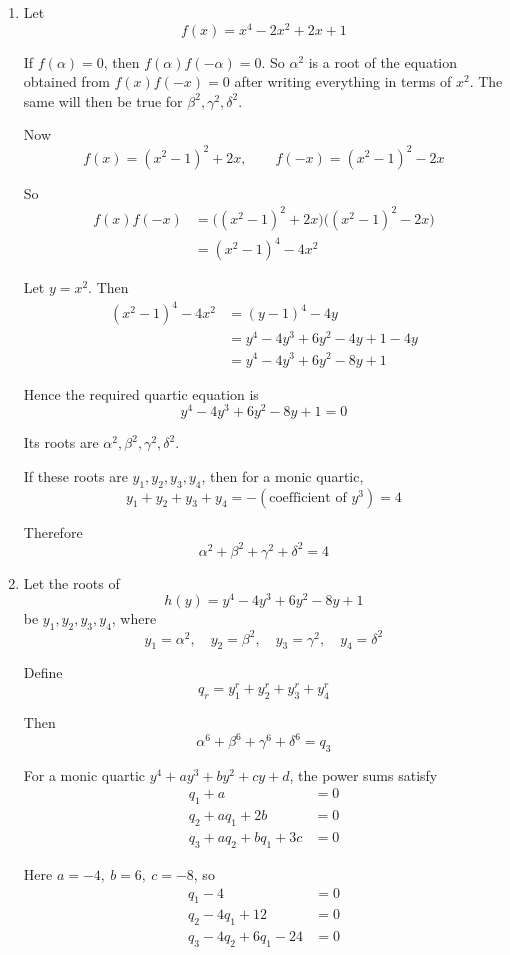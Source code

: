 \documentclass[leqno]{article}
\begin{document}
\begin{enumerate}[
  label=\textbf{\arabic*.},
  leftmargin=*,
  topsep=0pt,
  partopsep=0pt,
  parsep=0pt
]
\begin{tcolorbox}[colback=white, colframe=scarlet, title={\textbf{Solution}}, breakable, grow to left by=6mm, grow to right by=10mm]
\begin{enumerate}[label=\textbf{(\alph*)}]
  \item Let
\[
f(x)=x^4-2x^2+2x+1
\]

If \(f(\alpha)=0\), then \(f(\alpha)f(-\alpha)=0\). So \(\alpha^2\) is a root of the equation obtained from \(f(x)f(-x)=0\) after writing everything in terms of \(x^2\). The same will then be true for \(\beta^2,\gamma^2,\delta^2\).

Now
\[
f(x)=(x^2-1)^2+2x,\qquad f(-x)=(x^2-1)^2-2x
\]

So
\begin{align*}
f(x)f(-x)
&=\bigl((x^2-1)^2+2x\bigr)\bigl((x^2-1)^2-2x\bigr)\\
&=(x^2-1)^4-4x^2
\end{align*}

Let \(y=x^2\). Then
\begin{align*}
(x^2-1)^4-4x^2
&=(y-1)^4-4y\\
&=y^4-4y^3+6y^2-4y+1-4y\\
&=y^4-4y^3+6y^2-8y+1
\end{align*}

Hence the required quartic equation is
\[
y^4-4y^3+6y^2-8y+1=0
\]

Its roots are \(\alpha^2,\beta^2,\gamma^2,\delta^2\).

If these roots are \(y_1,y_2,y_3,y_4\), then for a monic quartic,
\[
y_1+y_2+y_3+y_4=-(\text{coefficient of }y^3)=4
\]

Therefore
\[
\alpha^2+\beta^2+\gamma^2+\delta^2=4
\]

  \item Let the roots of
\[
h(y)=y^4-4y^3+6y^2-8y+1
\]
be \(y_1,y_2,y_3,y_4\), where
\[
y_1=\alpha^2,\quad y_2=\beta^2,\quad y_3=\gamma^2,\quad y_4=\delta^2
\]

Define
\[
q_r=y_1^r+y_2^r+y_3^r+y_4^r
\]

Then
\[
\alpha^6+\beta^6+\gamma^6+\delta^6=q_3
\]

For a monic quartic \(y^4+ay^3+by^2+cy+d\), the power sums satisfy
\begin{align*}
q_1+a&=0\\
q_2+aq_1+2b&=0\\
q_3+aq_2+bq_1+3c&=0
\end{align*}

Here \(a=-4,\ b=6,\ c=-8\), so
\begin{align*}
q_1-4&=0\\
q_2-4q_1+12&=0\\
q_3-4q_2+6q_1-24&=0
\end{align*}


\end{enumerate}
\end{tcolorbox}
\end{enumerate}
\end{document}
